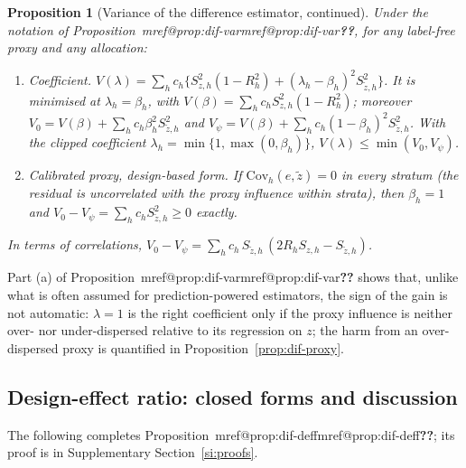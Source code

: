 \documentclass[pdflatex,sn-mathphys-num,iicol]{sn-jnl}
\makeatletter
\theoremstyle{thmstyleone}
\newtheorem{proposition}{Proposition}
\theoremstyle{thmstyletwo}
\theoremstyle{thmstylethree}
\newcommand{\Mref}[1]{\ifcsname mref@#1\endcsname\csname mref@#1\endcsname\else\textbf{??}\fi}
\makeatother
\begin{document}
\begin{proposition}[Variance of the difference estimator, continued]\label{prop:dif-var-ext}
Under the notation of Proposition~\Mref{prop:dif-var}, for any label-free proxy and any allocation:
\begin{enumerate}
\item[(a)] \emph{Coefficient.} $V(\lambda)=\sum_hc_h\{S^2_{z,h}(1-R_h^2)+(\lambda_h-\beta_h)^2S^2_{\tilde z,h}\}$. It is minimised at
$\lambda_h=\beta_h$, with $V(\beta)=\sum_hc_hS^2_{z,h}(1-R_h^2)$; moreover
$V_0=V(\beta)+\sum_hc_h\beta_h^2S^2_{\tilde z,h}$ and $V_\psi=V(\beta)+\sum_hc_h(1-\beta_h)^2S^2_{\tilde z,h}$. With the clipped coefficient
$\lambda_h=\min\{1,\max(0,\beta_h)\}$, $V(\lambda)\le\min(V_0,V_\psi)$.
\item[(b)] \emph{Calibrated proxy, design-based form.} If $\mathrm{Cov}_h(e,\tilde z)=0$ in every stratum (the residual is uncorrelated with the
proxy influence within strata), then $\beta_h=1$ and $V_0-V_\psi=\sum_hc_hS^2_{\tilde z,h}\ge0$ exactly.
\end{enumerate}
In terms of correlations, $V_0-V_\psi=\sum_hc_h\,S_{\tilde z,h}\,(2R_hS_{z,h}-S_{\tilde z,h})$.
\end{proposition}

Part (a) of Proposition~\Mref{prop:dif-var} shows that, unlike what is often assumed for prediction-powered estimators, the sign of the gain is not automatic:
$\lambda=1$ is the right coefficient only if the proxy influence is neither over- nor under-dispersed relative to
its regression on $z$; the harm from an over-dispersed proxy is quantified in Proposition~\ref{prop:dif-proxy}.

\subsection{Design-effect ratio: closed forms and discussion}\label{si:theory-deff-ratio}

The following completes Proposition~\Mref{prop:dif-deff}; its proof is in Supplementary Section~\ref{si:proofs}.
\end{document}
